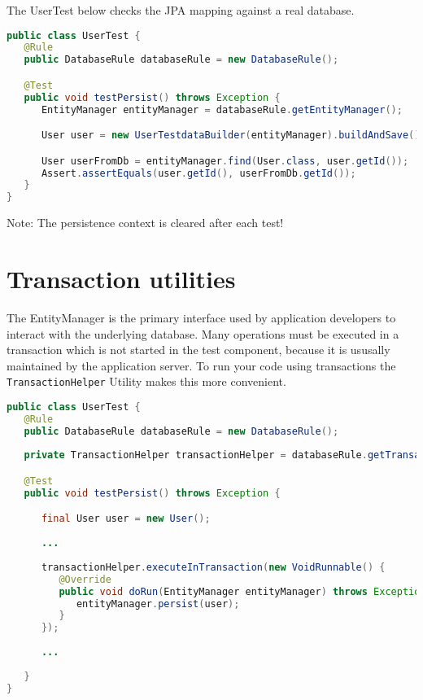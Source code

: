 The UserTest below checks the JPA mapping against a real database.

\begin{lstlisting}[language={JAVA},caption=User persistence test]
public class UserTest {
   @Rule
   public DatabaseRule databaseRule = new DatabaseRule();

   @Test
   public void testPersist() throws Exception {
      EntityManager entityManager = databaseRule.getEntityManager();

      User user = new UserTestdataBuilder(entityManager).buildAndSave();

      User userFromDb = entityManager.find(User.class, user.getId());
      Assert.assertEquals(user.getId(), userFromDb.getId());
   }
}
\end{lstlisting}

Note: The persistence context is cleared after each test!

\section{Transaction utilities}

The EntityManager is the primary interface used by application developers to interact with the underlying database.
Many operations must be executed in a transaction which is not started in the test component, because it is ususally maintained by
the application server. To run your code using transactions the \verb|TransactionHelper| Utility makes this more convenient.

\begin{lstlisting}[language={JAVA},caption=Transaction utilities]
public class UserTest {
   @Rule
   public DatabaseRule databaseRule = new DatabaseRule();
   
   private TransactionHelper transactionHelper = databaseRule.getTransactionHelper();

   @Test
   public void testPersist() throws Exception {

      final User user = new User();
      
      ...
      
      transactionHelper.executeInTransaction(new VoidRunnable() {
         @Override
         public void doRun(EntityManager entityManager) throws Exception {
            entityManager.persist(user);
         }
      });
      
      ...
      
   }
}
\end{lstlisting}

